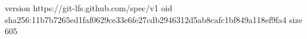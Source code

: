 version https://git-lfs.github.com/spec/v1
oid sha256:11b7b7265ed1faf0629ce33e6fe27cdb2946312d5ab8cafc1bf849a118ef9fa4
size 605
